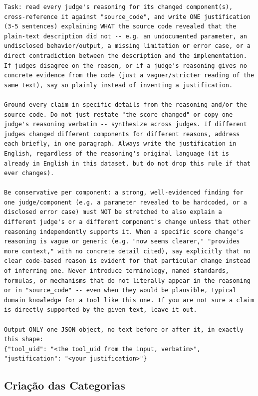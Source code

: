 \begin{lstlisting}[language={}, breaklines=true, basicstyle=\small\ttfamily, caption=Prompt de sistema: geração de justificativas, label=prompt:justificativas]
Task: read every judge's reasoning for its changed component(s), cross-reference it against "source_code", and write ONE justification (3-5 sentences) explaining WHAT the source code revealed that the plain-text description did not -- e.g. an undocumented parameter, an undisclosed behavior/output, a missing limitation or error case, or a direct contradiction between the description and the implementation. If judges disagree on the reason, or if a judge's reasoning gives no concrete evidence from the code (just a vaguer/stricter reading of the same text), say so plainly instead of inventing a justification.

Ground every claim in specific details from the reasoning and/or the source code. Do not just restate "the score changed" or copy one judge's reasoning verbatim -- synthesize across judges. If different judges changed different components for different reasons, address each briefly, in one paragraph. Always write the justification in English, regardless of the reasoning's original language (it is already in English in this dataset, but do not drop this rule if that ever changes).

Be conservative per component: a strong, well-evidenced finding for one judge/component (e.g. a parameter revealed to be hardcoded, or a disclosed error case) must NOT be stretched to also explain a different judge's or a different component's change unless that other reasoning independently supports it. When a specific score change's reasoning is vague or generic (e.g. "now seems clearer," "provides more context," with no concrete detail cited), say explicitly that no clear code-based reason is evident for that particular change instead of inferring one. Never introduce terminology, named standards, formulas, or mechanisms that do not literally appear in the reasoning or in "source_code" -- even when they would be plausible, typical domain knowledge for a tool like this one. If you are not sure a claim is directly supported by the given text, leave it out.

Output ONLY one JSON object, no text before or after it, in exactly this shape:
{"tool_uid": "<the tool_uid from the input, verbatim>", "justification": "<your justification>"}
\end{lstlisting}

\subsection*{Criação das Categorias}


